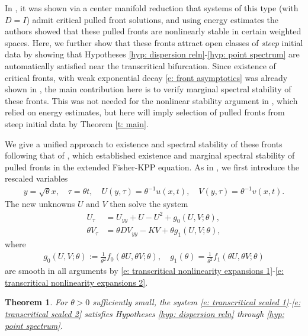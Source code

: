 \documentclass[11pt]{article}
\newtheorem{thmlocal}[prop]{Theorem}
\numberwithin{equation}{section}
\numberwithin{prop}{section}
\begin{document}
In \cite{RaugelKirchgassner}, it was shown via a center manifold reduction that systems of this type (with $D = I$) admit critical pulled front solutions, and using energy estimates the authors showed that these pulled fronts are nonlinearly stable in certain weighted spaces. Here, we further show that these fronts attract open classes of \emph{steep} initial data by showing that Hypotheses \ref{hyp: dispersion reln}-\ref{hyp: point spectrum} are automatically satisfied near the transcritical bifurcation. Since existence of critical fronts, with weak exponential decay \eqref{e: front asymptotics} was already shown in \cite{RaugelKirchgassner}, the main contribution here is to verify marginal spectral stability of these fronts. This was not needed for the nonlinear stability argument in \cite{RaugelKirchgassner}, which relied on energy estimates, but here will imply selection of pulled fronts from steep initial data by Theorem \ref{t: main}. 

We give a unified approach to existence and spectral stability of these fronts following that of \cite{AveryGarenaux}, which established existence and marginal spectral stability of pulled fronts in the extended Fisher-KPP equation. As in \cite{RaugelKirchgassner}, we first introduce the rescaled variables
\begin{align}
	y = \sqrt{\theta} x, \quad \tau = \theta t, \quad U(y, \tau) = \theta^{-1} u(x,t), \quad V(y, \tau) = \theta^{-1} v(x,t). 
\end{align}
The new unknowns $U$ and $V$ then solve the system
\begin{align}
	U_\tau &= U_{yy} + U - U^2 + g_0 (U, V; \theta), \label{e: transcritical scaled 1}\\
	\theta V_\tau &= \theta D V_{yy} - K V +  \theta g_1 (U, V; \theta), \label{e: transcritical scaled 2}
\end{align}
where
\begin{align}
	g_0 (U, V; \theta) := \frac{1}{\theta^2} f_0 (\theta U, \theta V; \theta), \quad g_1 (\theta) = \frac{1}{\theta^2} f_1 (\theta U, \theta V; \theta)
\end{align}
are smooth in all arguments by \eqref{e: transcritical nonlinearity expansions 1}-\eqref{e: transcritical nonlinearity expansions 2}. 

\begin{thmlocal}\label{t: transcritical}
	For $\theta > 0$ sufficiently small, the system \eqref{e: transcritical scaled 1}-\eqref{e: transcritical scaled 2} satisfies Hypotheses \ref{hyp: dispersion reln} through \ref{hyp: point spectrum}. 
\end{thmlocal}
\end{document}

